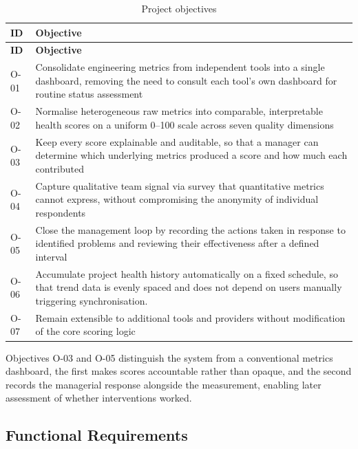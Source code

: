 \begin{longtable}{
  >{\raggedright\arraybackslash}p{}
  >{\raggedright\arraybackslash}p{}
}
\caption{Project objectives}
\label{tab:objectives}\\
\toprule
\textbf{ID} & \textbf{Objective} \\
\midrule
\endfirsthead
\toprule
\textbf{ID} & \textbf{Objective} \\
\midrule
\endhead
\bottomrule
\endlastfoot
O-01 & Consolidate engineering metrics from independent tools into a single
dashboard, removing the need to consult each tool's own dashboard for routine status
assessment \\
\addlinespace
O-02 & Normalise heterogeneous raw metrics into comparable, interpretable health
scores on a uniform 0--100 scale across seven quality dimensions \\
\addlinespace
O-03 & Keep every score explainable and auditable, so that a manager can determine
which underlying metrics produced a score and how much each contributed \\
\addlinespace
O-04 & Capture qualitative team signal via survey that quantitative metrics cannot express,
without compromising the anonymity of individual respondents \\
\addlinespace
O-05 & Close the management loop by recording the actions taken in response to
identified problems and reviewing their effectiveness after a defined interval \\
\addlinespace
O-06 & Accumulate project health history automatically on a fixed schedule, so that trend data is evenly spaced and does not depend on users manually triggering synchronisation. \\
\addlinespace
O-07 & Remain extensible to additional tools and providers without modification of
the core scoring logic \\
\end{longtable}

Objectives O-03 and O-05 distinguish the system from a conventional metrics
dashboard, the first makes scores accountable rather than opaque, and the second
records the managerial response alongside the measurement, enabling later
assessment of whether interventions worked.

\subsection{Functional Requirements}
\label{subsec:functional-requirements}

